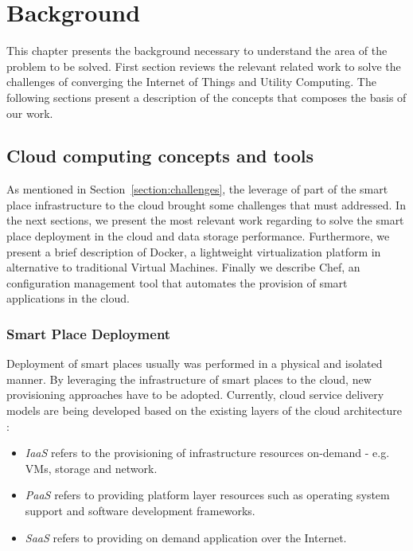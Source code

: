 
\chapter{Background}
\label{chapter:background}
This chapter presents the background necessary to understand the area of the problem to be solved.
First section reviews the relevant related work to solve the challenges of converging the Internet
of Things and Utility Computing. The following sections present a description of the concepts
that composes the basis of our work.

\section{Cloud computing concepts and tools}
\label{sub:cloud_concepts_tools}
As mentioned in Section~\ref{section:challenges}, the leverage of part of the smart place infrastructure
to the cloud brought some challenges that must addressed. In the next sections, we present the most
relevant work regarding to solve the smart place deployment in the cloud and data storage performance.
Furthermore, we present a brief description of Docker, a lightweight virtualization platform in
alternative to traditional Virtual Machines. Finally we describe Chef, an configuration management tool
that automates the provision of smart applications in the cloud.

\subsection{Smart Place Deployment}
\label{sub:smart_place_deployment}
Deployment of smart places usually was performed in a physical and isolated manner. By leveraging the
infrastructure of smart places to the cloud, new provisioning approaches have to be adopted. Currently,
cloud service delivery models are being developed based on the existing layers of the cloud
architecture \cite{zhang2010cloud}:

\begin{itemize}
  \item\textit{\gls{IaaS}} refers to the provisioning of infrastructure resources on-demand - e.g.
  \glspl{VM}, storage and network.
  \item\textit{\gls{PaaS}} refers to providing platform layer resources such as operating system support
  and software development frameworks.
  \item\textit{\gls{SaaS}} refers to providing on demand application over the Internet.
\end{itemize}

